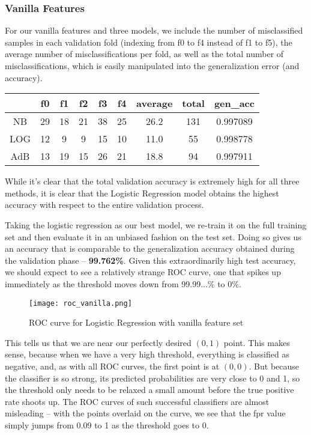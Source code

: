 \documentclass{article} %
\begin{document}
\subsubsection{Vanilla Features}
For our vanilla features and three models, we include the number of misclassified samples in each validation fold (indexing from f0 to f4 instead of f1 to f5), the average number of misclassifications per fold, as well as the total number of misclassifications, which is easily manipulated into the generalization error (and accuracy).
\begin{table}[h]
\centering
\begin{tabular}{|c|c|c|c|c|c|c|c|c|}
\hline
    & f0 & f1 & f2 & f3 & f4 & average & total & gen\_acc \\ \hline
NB  & 29 & 18 & 21 & 38 & 25 & 26.2    & 131   & 0.997089 \\ \hline
LOG & 12 & 9  & 9  & 15 & 10 & 11.0    & 55    & 0.998778 \\ \hline
AdB & 13 & 19 & 15 & 26 & 21 & 18.8    & 94    & 0.997911 \\ \hline
\end{tabular}
\end{table}
While it's clear that the total validation accuracy is extremely high for all three methods, it is clear that the Logistic Regression model obtains the highest accuracy with respect to the entire validation process.\par 
Taking the logistic regression as our best model, we re-train it on the full training set and then evaluate it in an unbiased fashion on the test set.  Doing so gives us an accuracy that is comparable to the generalization accuracy obtained during the validation phase -- \textbf{99.762\%}.  Given this extraordinarily high test accuracy, we should expect to see a relatively strange ROC curve, one that spikes up immediately as the threshold moves down from 99.99...\% to 0\%.
\begin{figure}[h]
\centering
\texttt{[image: roc\_vanilla.png]}
\caption{ROC curve for Logistic Regression with vanilla feature set}
\end{figure}
This tells us that we are near our perfectly desired $(0, 1)$ point.  This makes sense, because when we have a very high threshold, everything is classified as negative, and, as with all ROC curves, the first point is at $(0, 0)$.  But because the classifier is so strong, its predicted probabilities are very close to 0 and 1, so the threshold only needs to be relaxed a small amount before the true positive rate shoots up.  The ROC curves of such successful classifiers are almost misleading -- with the points overlaid on the curve, we see that the fpr value simply jumps from 0.09 to 1 as the threshold goes to 0.
\end{document}
